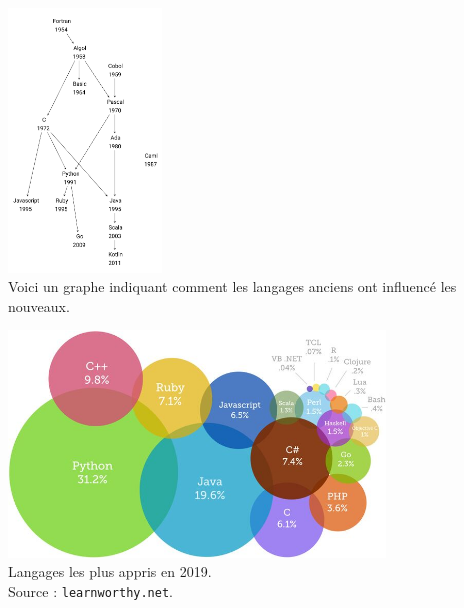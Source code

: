 \documentclass[10pt]{beamer}
\begin{document}
\begin{frame}

\begin{center}
	\includegraphics[height=7cm]{genealogie.png}\\ \scriptsize	Voici un graphe indiquant comment les langages anciens ont influencé les nouveaux.
\end{center}

\end{frame}
\begin{frame}

\begin{center}
	\includegraphics[width=10cm]{languages.png}\\ \scriptsize	Langages les plus appris en 2019.\\
	Source : \texttt{learnworthy.net}.
\end{center}
\end{frame}
\end{document}
